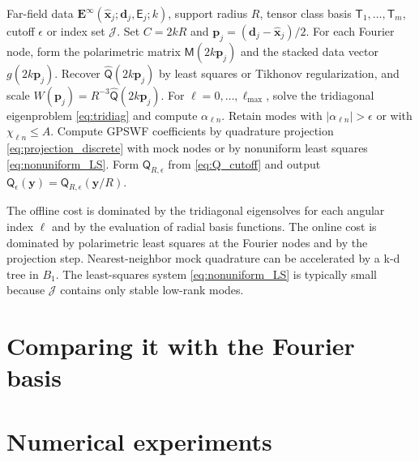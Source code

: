 \documentclass[11pt]{article}
\numberwithin{equation}{section}
\newcommand{\vect}[1]{\bm{#1}}
\newcommand{\tens}[1]{\bm{\mathsf{#1}}}
\newcommand{\Qt}{\ensuremath{\tens{Q}}}
\newcommand{\Tt}{\ensuremath{\tens{T}}}
\newcommand{\Mt}{\ensuremath{\tens{M}}}
\newcommand{\abs}[1]{\left\lvert #1\right\rvert}
\theoremstyle{plain}
\theoremstyle{definition}
\begin{document}
\begin{algorithm}[t]
\caption{Anisotropic Maxwell-GPSWF low-rank inversion}
\label{alg:main}
\begin{algorithmic}[1]
\Require Far-field data $\vect{E}^\infty(\hat{\vect{x}}_j;\vect{d}_j,\tens{E}_j;k)$, support radius $R$, tensor class basis $\Tt_1,\ldots,\Tt_m$, cutoff $\epsilon$ or index set $\mathcal J$.
\State Set $C=2kR$ and $\vect{p}_{j}=(\vect{d}_{j}-\hat{\vect{x}}_{j})/2$.
\State For each Fourier node, form the polarimetric matrix $\Mt(2k\vect{p}_{j})$ and the stacked data vector $g(2k\vect{p}_{j})$.
\State Recover $\widehat{\Qt}(2k\vect{p}_{j})$ by least squares or Tikhonov regularization, and scale $W(\vect{p}_{j})=R^{-3}\widehat{\Qt}(2k\vect{p}_{j})$.
\State For $\ell=0,\ldots,\ell_{\max}$, solve the tridiagonal eigenproblem \eqref{eq:tridiag} and compute $\alpha_{\ell n}$.
\State Retain modes with $\abs{\alpha_{\ell n}}>\epsilon$ or with $\chi_{\ell n}\le A$.
\State Compute GPSWF coefficients by quadrature projection \eqref{eq:projection_discrete} with mock nodes or by nonuniform least squares \eqref{eq:nonuniform_LS}.
\State Form $\Qt_{R,\epsilon}$ from \eqref{eq:Q_cutoff} and output $\Qt_\epsilon(\vect{y})=\Qt_{R,\epsilon}(\vect{y}/R)$.
\end{algorithmic}
\end{algorithm}

The offline cost is dominated by the tridiagonal eigensolves for each angular index $\ell$ and by the evaluation of radial basis functions.  The online cost is dominated by polarimetric least squares at the Fourier nodes and by the projection step.  Nearest-neighbor mock quadrature can be accelerated by a k-d tree in $B_1$.  The least-squares system \eqref{eq:nonuniform_LS} is typically small because $\mathcal J$ contains only stable low-rank modes.


\section{Comparing it with the Fourier basis}












\section{Numerical experiments}
\label{sec:numerics}
\label{sec:maxwell-gpswf-numerics}
\end{document}
